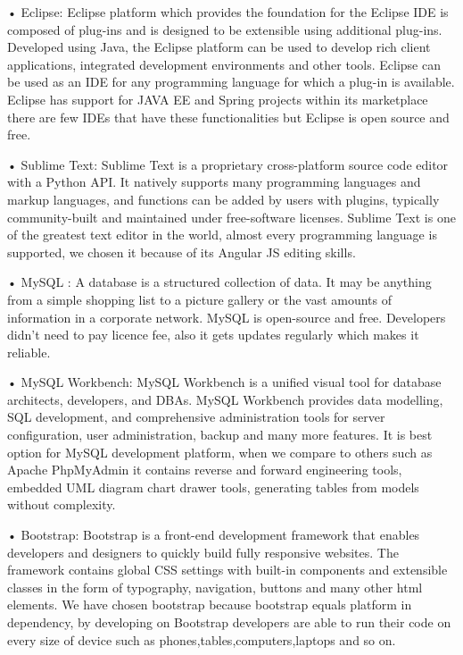• Eclipse: Eclipse platform which provides the foundation for the Eclipse IDE is composed of plug-ins and is designed to be extensible using additional plug-ins. Developed using Java, the Eclipse platform can be used to develop rich client applications, integrated development environments and other tools. \cite{eclipseTanim}
Eclipse can be used as an IDE for any programming language for which a plug-in is available. Eclipse has support for JAVA EE and Spring projects within its marketplace there are few IDEs that have these functionalities but Eclipse is open source and free.

• Sublime Text: Sublime Text is a proprietary cross-platform source code editor with a Python API. It natively supports many programming languages and markup languages, and functions can be added by users with plugins, typically community-built and maintained under free-software licenses. \cite{sublimeTanim}
Sublime Text is one of the greatest text editor in the world, almost every programming language is supported, we chosen it because of its Angular JS editing skills.

• MySQL : A database is a structured collection of data. It may be anything from a simple shopping list to a picture gallery or the vast amounts of information in a corporate network. \cite{mySQLTanim}
 MySQL is open-source and free. Developers didn't need to pay licence fee, also it gets updates regularly which makes it reliable.

• MySQL Workbench: MySQL Workbench is a unified visual tool for database architects, developers, and DBAs. MySQL Workbench provides data modelling, SQL development, and comprehensive administration tools for server configuration, user administration, backup and many more features. \cite{mySQLWorkTanim}
It is best option for MySQL development platform, when we compare to others such as Apache PhpMyAdmin it contains reverse and forward engineering tools, embedded UML diagram chart drawer tools, generating tables from models without complexity.

• Bootstrap: Bootstrap is a front-end development framework that enables developers and designers to quickly build fully responsive websites. The framework contains global CSS settings with built-in components and extensible classes in the form of typography, navigation, buttons and many other html elements. \cite{BootstrapTanim}
 We have chosen bootstrap because bootstrap equals platform in dependency, by developing on Bootstrap developers are able to run their code on every size of device such as phones,tables,computers,laptops and so on.

